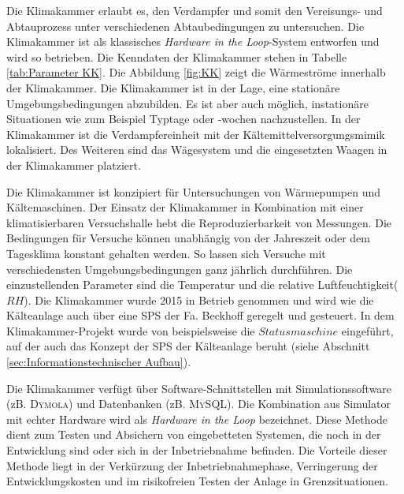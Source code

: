 Die Klimakammer erlaubt es, den Verdampfer und somit den Vereisungs- und Abtauprozess unter verschiedenen Abtaubedingungen zu untersuchen. Die Klimakammer ist als klassisches \textit{Hardware in the Loop}-System entworfen und wird so betrieben.  Die Kenndaten der Klimakammer stehen in Tabelle \ref{tab:Parameter KK}. Die Abbildung \ref{fig:KK} zeigt die Wärmeströme innerhalb der Klimakammer. Die Klimakammer ist in der Lage, eine stationäre Umgebungsbedingungen abzubilden. Es ist aber auch möglich, instationäre Situationen wie zum Beispiel Typtage oder -wochen nachzustellen. 
In der Klimakammer ist die Verdampfereinheit mit der Kältemittelversorgungsmimik lokalisiert. Des Weiteren sind das Wägesystem und die eingesetzten Waagen in der Klimakammer platziert. 



Die Klimakammer ist konzipiert für  Untersuchungen von Wärmepumpen und Kältemaschinen. Der Einsatz der Klimakammer in Kombination mit einer klimatisierbaren Versuchshalle hebt die Reproduzierbarkeit von Messungen. Die Bedingungen für Versuche können unabhängig von der Jahreszeit oder dem Tagesklima konstant gehalten werden. So lassen sich Versuche mit verschiedensten Umgebungsbedingungen ganz jährlich durchführen.  Die einzustellenden Parameter sind die Temperatur und die relative Luftfeuchtigkeit($RH$). Die Klimakammer wurde 2015 in Betrieb genommen und wird wie die Kälteanlage auch über eine SPS der Fa. Beckhoff geregelt und gesteuert. In dem Klimakammer-Projekt wurde von \textsc{\citeauthor{Nuerenberg2015}} beispielsweise die $Statusmaschine$ eingeführt, auf der auch das Konzept der SPS der Kälteanlage beruht (siehe Abschnitt \ref{sec:Informationstechnischer Aufbau}). 

Die Klimakammer verfügt über Software-Schnittstellen  mit Simulationssoftware (zB. \textsc{Dymola}) und Datenbanken (zB. \textsc{MySQL}). Die Kombination aus Simulator mit echter Hardware wird als \textit{Hardware in the Loop} bezeichnet. Diese Methode dient zum Testen und Absichern von eingebetteten Systemen, die noch in der Entwicklung sind oder sich in der Inbetriebnahme befinden. Die Vorteile dieser Methode liegt in der Verkürzung der Inbetriebnahmephase, Verringerung der Entwicklungskosten und im risikofreien Testen der Anlage in Grenzsituationen. \citep{OPALRTT2014}


